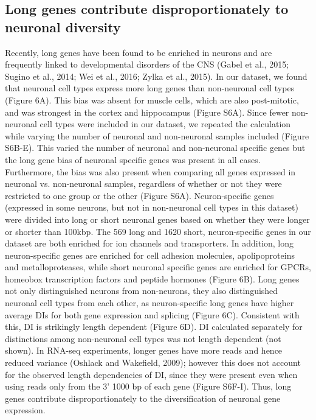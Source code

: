 \subsection{Long genes contribute disproportionately to neuronal diversity}

Recently, long genes have been found to be enriched in neurons and are frequently linked to developmental disorders of the CNS (Gabel et al., 2015; Sugino et al., 2014; Wei et al., 2016; Zylka et al., 2015). In our dataset, we found that neuronal cell types express more long genes than non-neuronal cell types (Figure 6A). This bias was absent for muscle cells, which are also post-mitotic, and was strongest in the cortex and hippocampus (Figure S6A). Since fewer non-neuronal cell types were included in our dataset, we repeated the calculation while varying the number of neuronal and non-neuronal samples included (Figure S6B-E). This varied the number of neuronal and non-neuronal specific genes but the long gene bias of neuronal specific genes was present in all cases. Furthermore, the bias was also present when comparing all genes expressed in neuronal vs. non-neuronal samples, regardless of whether or not they were restricted to one group or the other (Figure S6A). 
Neuron-specific genes (expressed in some neurons, but not in non-neuronal cell types in this dataset) were divided into long or short neuronal genes based on whether they were longer or shorter than 100kbp. The 569 long and 1620 short, neuron-specific genes in our dataset are both enriched for ion channels and transporters. In addition, long neuron-specific genes are enriched for cell adhesion molecules, apolipoproteins and metalloproteases, while short neuronal specific genes are enriched for GPCRs, homeobox transcription factors and peptide hormones (Figure 6B).
Long genes not only distinguished neurons from non-neurons, they also distinguished neuronal cell types from each other, as neuron-specific long genes have higher average DIs for both gene expression and splicing (Figure 6C). Consistent with this, DI is strikingly length dependent (Figure 6D). DI calculated separately for distinctions among non-neuronal cell types was not length dependent (not shown).
In RNA-seq experiments, longer genes have more reads and hence reduced variance (Oshlack and Wakefield, 2009); however this does not account for the observed length dependencies of DI, since they were present even when using reads only from the 3' 1000 bp of each gene (Figure S6F-I). Thus, long genes contribute disproportionately to the diversification of neuronal gene expression.